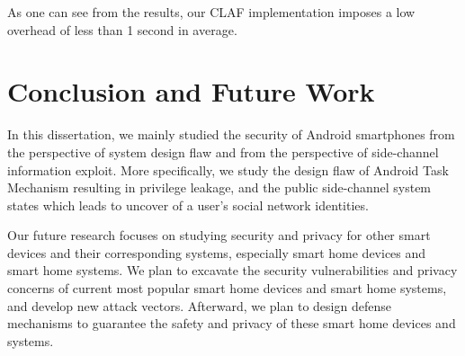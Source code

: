 \documentclass[letterpaper,12pt]{article}
\begin{document}
As one can see from the results, our CLAF implementation imposes a low overhead of less than 1 second in average. 


\section{Conclusion and Future Work}\label{sec:conclusion}
In this dissertation, we mainly studied the security of Android smartphones from the perspective of system design flaw and from the perspective of side-channel information exploit. More specifically, we study the design flaw of Android Task Mechanism resulting in privilege leakage, and the public side-channel system states which leads to uncover of a user's social network identities. 

Our future research focuses on studying security and privacy for other smart devices and their corresponding systems, especially smart home devices and smart home systems. We plan to excavate the security vulnerabilities and privacy concerns of current most popular smart home devices and smart home systems, and develop new attack vectors. Afterward, we plan to design defense mechanisms to guarantee the safety and privacy of these smart home devices and systems. 

        \newpage
   
   
\end{document}
